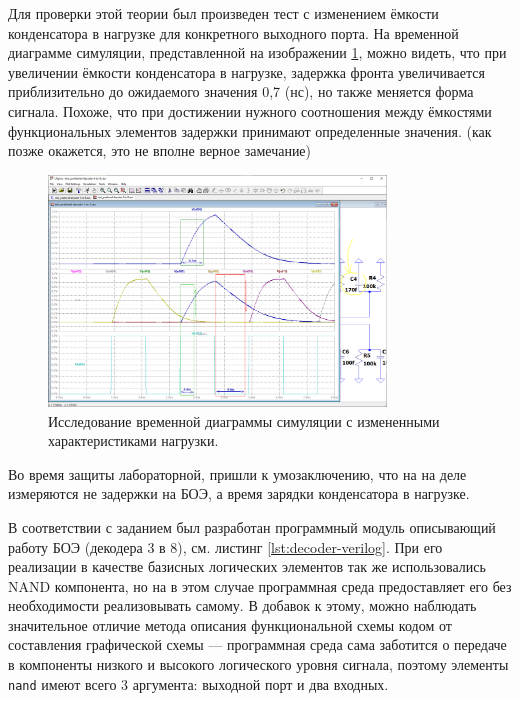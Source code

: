 Для проверки этой теории был произведен тест с изменением ёмкости конденсатора в
нагрузке для конкретного выходного порта. На временной диаграмме симуляции, представленной на 
изображении \ref{fig:decoder-simulation-inspect-research}, можно видеть, что при
увеличении ёмкости конденсатора в нагрузке, задержка фронта увеличивается
приблизительно до ожидаемого значения 0,7 (нс), но также меняется форма сигнала.
Похоже, что при достижении нужного соотношения между ёмкостями функциональных
элементов задержки принимают определенные значения. (как позже окажется, это не
вполне верное замечание)
\begin{figure}[H]
    \centering
    \includegraphics[width=0.8\textwidth]{res/3-to-8-decoder_simulation-inspect-level-research.png}
    \caption{Исследование временной диаграммы симуляции с измененными характеристиками нагрузки.}
    \label{fig:decoder-simulation-inspect-research}
\end{figure}

Во время защиты лабораторной, пришли к умозаключению, что на
на деле измеряются не задержки на БОЭ, а время зарядки конденсатора в нагрузке.


В соответствии с заданием был разработан программный модуль описывающий работу
БОЭ (декодера 3 в 8), см. листинг \ref{lst:decoder-verilog}. При его реализации
в качестве базисных логических элементов так же использовались NAND компонента,
но на в этом случае программная среда предоставляет его без необходимости
реализовывать самому. В добавок к этому, можно наблюдать значительное отличие
метода описания функциональной схемы кодом от составления графической схемы ---
программная среда сама заботится о передаче в компоненты низкого и высокого
логического уровня сигнала, поэтому элементы \verb|nand| имеют всего 3
аргумента: выходной порт и два входных. 

